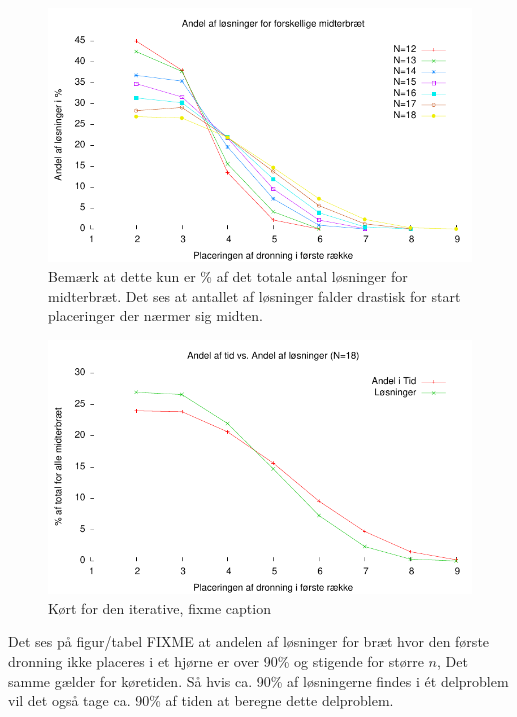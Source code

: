 \documentclass[draft,a4paper,11pt]{article}
\begin{document}
\begin{figure}
\includegraphics{../benchmarks/middleandel.pdf}
\caption{Bemærk at dette kun er \% af det totale antal løsninger for midterbræt. Det ses at antallet af løsninger falder drastisk for start placeringer der nærmer sig midten.}
\label{fig:midterandel}
\end{figure}

\begin{figure}
\includegraphics{../benchmarks/tidsandel.pdf}
\caption{Kørt for den iterative, fixme caption}
\label{fig:tidsvssol}
\end{figure}

Det ses på figur/tabel FIXME at andelen af løsninger for bræt hvor den første dronning ikke placeres i et hjørne er over 90\% og stigende for større $n$, Det samme gælder for køretiden. Så hvis ca. 90\% af løsningerne findes i ét delproblem vil det også tage ca. 90\% af tiden at beregne dette delproblem. 
\end{document}
